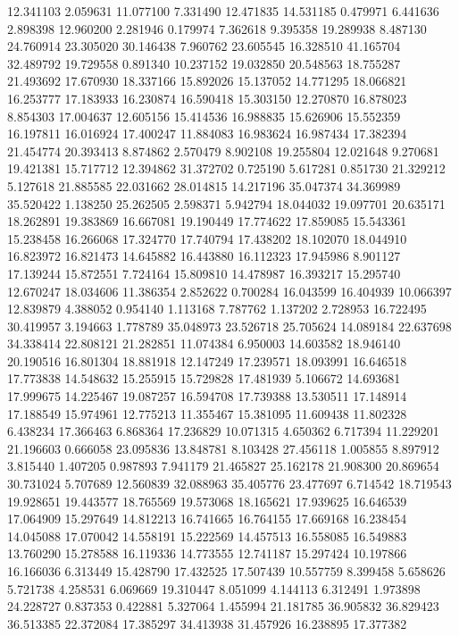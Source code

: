 12.341103
2.059631
11.077100
7.331490
12.471835
14.531185
0.479971
6.441636
2.898398
12.960200
2.281946
0.179974
7.362618
9.395358
19.289938
8.487130
24.760914
23.305020
30.146438
7.960762
23.605545
16.328510
41.165704
32.489792
19.729558
0.891340
10.237152
19.032850
20.548563
18.755287
21.493692
17.670930
18.337166
15.892026
15.137052
14.771295
18.066821
16.253777
17.183933
16.230874
16.590418
15.303150
12.270870
16.878023
8.854303
17.004637
12.605156
15.414536
16.988835
15.626906
15.552359
16.197811
16.016924
17.400247
11.884083
16.983624
16.987434
17.382394
21.454774
20.393413
8.874862
2.570479
8.902108
19.255804
12.021648
9.270681
19.421381
15.717712
12.394862
31.372702
0.725190
5.617281
0.851730
21.329212
5.127618
21.885585
22.031662
28.014815
14.217196
35.047374
34.369989
35.520422
1.138250
25.262505
2.598371
5.942794
18.044032
19.097701
20.635171
18.262891
19.383869
16.667081
19.190449
17.774622
17.859085
15.543361
15.238458
16.266068
17.324770
17.740794
17.438202
18.102070
18.044910
16.823972
16.821473
14.645882
16.443880
16.112323
17.945986
8.901127
17.139244
15.872551
7.724164
15.809810
14.478987
16.393217
15.295740
12.670247
18.034606
11.386354
2.852622
0.700284
16.043599
16.404939
10.066397
12.839879
4.388052
0.954140
1.113168
7.787762
1.137202
2.728953
16.722495
30.419957
3.194663
1.778789
35.048973
23.526718
25.705624
14.089184
22.637698
34.338414
22.808121
21.282851
11.074384
6.950003
14.603582
18.946140
20.190516
16.801304
18.881918
12.147249
17.239571
18.093991
16.646518
17.773838
14.548632
15.255915
15.729828
17.481939
5.106672
14.693681
17.999675
14.225467
19.087257
16.594708
17.739388
13.530511
17.148914
17.188549
15.974961
12.775213
11.355467
15.381095
11.609438
11.802328
6.438234
17.366463
6.868364
17.236829
10.071315
4.650362
6.717394
11.229201
21.196603
0.666058
23.095836
13.848781
8.103428
27.456118
1.005855
8.897912
3.815440
1.407205
0.987893
7.941179
21.465827
25.162178
21.908300
20.869654
30.731024
5.707689
12.560839
32.088963
35.405776
23.477697
6.714542
18.719543
19.928651
19.443577
18.765569
19.573068
18.165621
17.939625
16.646539
17.064909
15.297649
14.812213
16.741665
16.764155
17.669168
16.238454
14.045088
17.070042
14.558191
15.222569
14.457513
16.558085
16.549883
13.760290
15.278588
16.119336
14.773555
12.741187
15.297424
10.197866
16.166036
6.313449
15.428790
17.432525
17.507439
10.557759
8.399458
5.658626
5.721738
4.258531
6.069669
19.310447
8.051099
4.144113
6.312491
1.973898
24.228727
0.837353
0.422881
5.327064
1.455994
21.181785
36.905832
36.829423
36.513385
22.372084
17.385297
34.413938
31.457926
16.238895
17.377382
